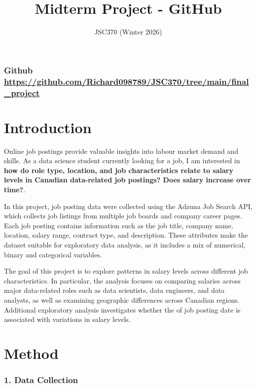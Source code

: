 \documentclass[
  letterpaper,
  DIV=11,
  numbers=noendperiod]{scrartcl}
\title{Midterm Project - GitHub}
\subtitle{JSC370 (Winter 2026)}
\author{}
\date{}
\begin{document}
\maketitle


\subsubsection{\texorpdfstring{Github
\href{link}{https://github.com/Richard098789/JSC370/tree/main/final\_project}}{Github https://github.com/Richard098789/JSC370/tree/main/final\_project}}\label{github-httpsgithub.comrichard098789jsc370treemainfinal_project}

\section{Introduction}\label{introduction}

Online job postings provide valuable insights into labour market demand
and skills. As a data science student currently looking for a job, I am
interested in \textbf{how do role type, location, and job
characteristics relate to salary levels in Canadian data-related job
postings? Does salary increase over time?}.

In this project, job posting data were collected using the Adzuna Job
Search API, which collects job listings from multiple job boards and
company career pages. Each job posting contains information such as the
job title, company name, location, salary range, contract type, and
description. These attributes make the dataset suitable for exploratory
data analysis, as it includes a mix of numerical, binary and categorical
variables.

The goal of this project is to explore patterns in salary levels across
different job characteristics. In particular, the analysis focuses on
comparing salaries across major data-related roles such as data
scientists, data engineers, and data analysts, as well as examining
geographic differences across Canadian regions. Additional exploratory
analysis investigates whether the of job posting date is associated with
variations in salary levels.

\section{Method}\label{method}

\subsubsection{1. Data Collection}\label{data-collection}
\end{document}
